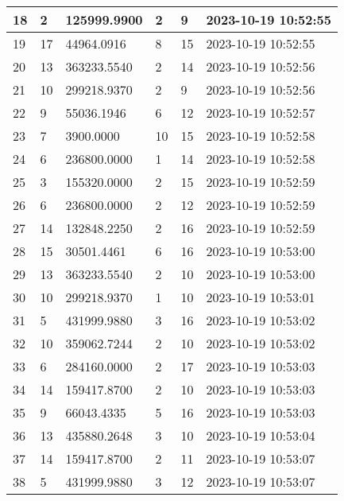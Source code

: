 \begin{longtable}{|l|l|l|l|l|l|}
18 & 2 & 125999.9900 & 2 & 9 & 2023-10-19 10:52:55 \\ \hline 
19 & 17 & 44964.0916 & 8 & 15 & 2023-10-19 10:52:55 \\ \hline 
20 & 13 & 363233.5540 & 2 & 14 & 2023-10-19 10:52:56 \\ \hline 
21 & 10 & 299218.9370 & 2 & 9 & 2023-10-19 10:52:56 \\ \hline 
22 & 9 & 55036.1946 & 6 & 12 & 2023-10-19 10:52:57 \\ \hline 
23 & 7 & 3900.0000 & 10 & 15 & 2023-10-19 10:52:58 \\ \hline 
24 & 6 & 236800.0000 & 1 & 14 & 2023-10-19 10:52:58 \\ \hline 
25 & 3 & 155320.0000 & 2 & 15 & 2023-10-19 10:52:59 \\ \hline 
26 & 6 & 236800.0000 & 2 & 12 & 2023-10-19 10:52:59 \\ \hline 
27 & 14 & 132848.2250 & 2 & 16 & 2023-10-19 10:52:59 \\ \hline 
28 & 15 & 30501.4461 & 6 & 16 & 2023-10-19 10:53:00 \\ \hline 
29 & 13 & 363233.5540 & 2 & 10 & 2023-10-19 10:53:00 \\ \hline 
30 & 10 & 299218.9370 & 1 & 10 & 2023-10-19 10:53:01 \\ \hline 
31 & 5 & 431999.9880 & 3 & 16 & 2023-10-19 10:53:02 \\ \hline 
32 & 10 & 359062.7244 & 2 & 10 & 2023-10-19 10:53:02 \\ \hline 
33 & 6 & 284160.0000 & 2 & 17 & 2023-10-19 10:53:03 \\ \hline 
34 & 14 & 159417.8700 & 2 & 10 & 2023-10-19 10:53:03 \\ \hline 
35 & 9 & 66043.4335 & 5 & 16 & 2023-10-19 10:53:03 \\ \hline 
36 & 13 & 435880.2648 & 3 & 10 & 2023-10-19 10:53:04 \\ \hline 
37 & 14 & 159417.8700 & 2 & 11 & 2023-10-19 10:53:07 \\ \hline 
38 & 5 & 431999.9880 & 3 & 12 & 2023-10-19 10:53:07 \\ \hline 
 \end{longtable}

